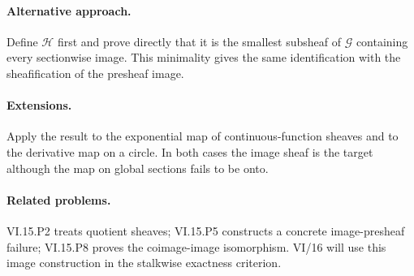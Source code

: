 \paragraph{Alternative approach.}
Define $\mathcal H$ first and prove directly that it is the smallest subsheaf of $\mathcal G$
containing every sectionwise image.  This minimality gives the same identification with the
sheafification of the presheaf image.

\paragraph{Extensions.}
Apply the result to the exponential map of continuous-function sheaves and to the derivative
map on a circle.  In both cases the image sheaf is the target although the map on global
sections fails to be onto.

\paragraph{Related problems.}
VI.15.P2 treats quotient sheaves; VI.15.P5 constructs a concrete image-presheaf failure;
VI.15.P8 proves the coimage-image isomorphism.  VI/16 will use this image construction in the
stalkwise exactness criterion.
\fi
